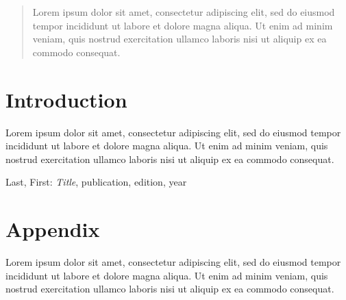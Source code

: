 \documentclass[a4, english, twosided]{article}
\begin{document}
\maketitle

\begin{abstract}
\noindent
Lorem ipsum dolor sit amet, consectetur adipiscing elit, sed do eiusmod tempor incididunt ut labore et dolore magna aliqua. Ut enim ad minim veniam, quis nostrud exercitation ullamco laboris nisi ut aliquip ex ea commodo consequat.
\end{abstract}

\tableofcontents

\newpage
\section{Introduction} \label{sec:intro}
Lorem ipsum dolor sit amet, consectetur adipiscing elit, sed do eiusmod tempor incididunt ut labore et dolore magna aliqua. Ut enim ad minim veniam, quis nostrud exercitation ullamco laboris nisi ut aliquip ex ea commodo consequat.



\begin{thebibliography}{9}
	Last, First: \emph{Title}, publication, edition, year
\end{thebibliography}



\newpage
\appendix
\section{Appendix}
Lorem ipsum dolor sit amet, consectetur adipiscing elit, sed do eiusmod tempor incididunt ut labore et dolore magna aliqua. Ut enim ad minim veniam, quis nostrud exercitation ullamco laboris nisi ut aliquip ex ea commodo consequat.
\end{document}
